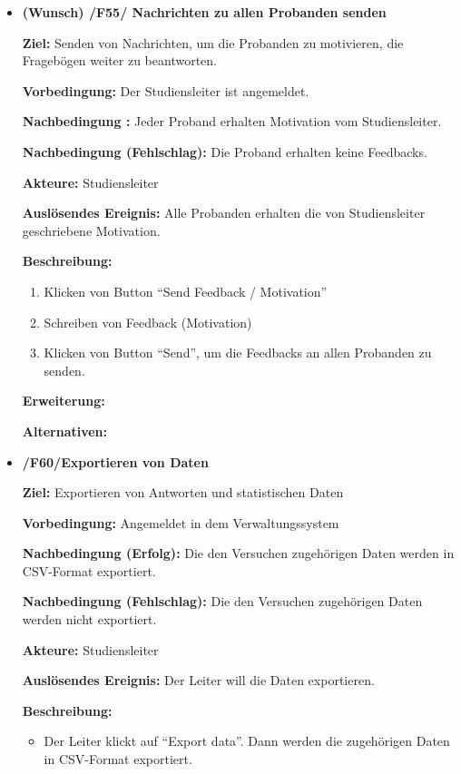 \documentclass[a4paper]{scrreprt}
\begin{document}
\begin{itemize}
                \item \textbf{(Wunsch) /F55/ Nachrichten zu allen \gls{Proband}en senden}
                \par \textbf{Ziel: }Senden von Nachrichten, um die \gls{Proband}en zu motivieren, die Fragebögen weiter zu beantworten.
                \par \textbf{Vorbedingung: }Der \gls{Studiensleiter} ist angemeldet.
                \par \textbf{Nachbedingung : }Jeder \gls{Proband} erhalten Motivation vom \gls{Studiensleiter}.
                \par \textbf{Nachbedingung (Fehlschlag): }Die \gls{Proband} erhalten keine Feedbacks.
                \par \textbf{Akteure: }\gls{Studiensleiter}
                \par \textbf{Auslösendes Ereignis: }Alle \gls{Proband}en erhalten die von \gls{Studiensleiter} geschriebene Motivation.
                \par \textbf{Beschreibung: }
                \begin{enumerate}
                    \item Klicken von Button ``Send Feedback / Motivation''
                    \item Schreiben von Feedback (Motivation)
                    \item Klicken von Button ``Send'', um die Feedbacks an allen \gls{Proband}en zu senden.
                \end{enumerate}
                \par \textbf{Erweiterung: }
                \par \textbf{Alternativen: }


                \item \textbf{/F60/Exportieren von Daten}

                \par \textbf{Ziel: }Exportieren von Antworten und statistischen Daten
                \par \textbf{Vorbedingung: }Angemeldet in dem Verwaltungssystem
                \par \textbf{Nachbedingung (Erfolg): }Die den Versuchen zugehörigen Daten werden in CSV-Format exportiert.
                \par \textbf{Nachbedingung (Fehlschlag): }Die den Versuchen zugehörigen Daten werden nicht exportiert.
                \par \textbf{Akteure: }\gls{Studiensleiter}
                \par \textbf{Auslösendes Ereignis: }Der Leiter will die Daten exportieren.
                \par \textbf{Beschreibung: }
                \begin{itemize}
                    \item Der Leiter klickt auf ``Export data''. Dann werden die zugehörigen Daten in CSV-Format exportiert.
                \end{itemize}
            \end{itemize}
\end{document}
